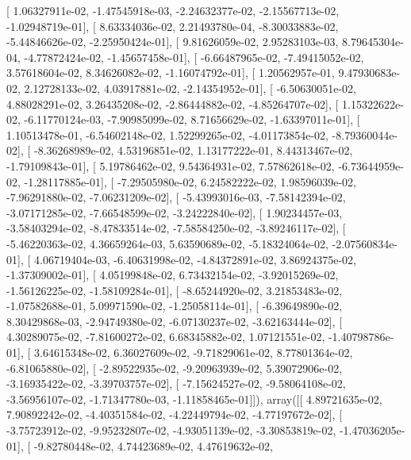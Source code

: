 \documentclass{article}
\begin{document}
       [  1.06327911e-02,  -1.47545918e-03,  -2.24632377e-02,
         -2.15567713e-02,  -1.02948719e-01],
       [  8.63334036e-02,   2.21493780e-04,  -8.30033883e-02,
         -5.44846626e-02,  -2.25950424e-01],
       [  9.81626059e-02,   2.95283103e-03,   8.79645304e-04,
         -4.77872424e-02,  -1.45657458e-01],
       [ -6.66487965e-02,  -7.49415052e-02,   3.57618604e-02,
          8.34626082e-02,  -1.16074792e-01],
       [  1.20562957e-01,   9.47930683e-02,   2.12728133e-02,
          4.03917881e-02,  -2.14354952e-01],
       [ -6.50630051e-02,   4.88028291e-02,   3.26435208e-02,
         -2.86444882e-02,  -4.85264707e-02],
       [  1.15322622e-02,  -6.11770124e-03,  -7.90985099e-02,
          8.71656629e-02,  -1.63397011e-01],
       [  1.10513478e-01,  -6.54602148e-02,   1.52299265e-02,
         -4.01173854e-02,  -8.79360044e-02],
       [ -8.36268989e-02,   4.53196851e-02,   1.13177222e-01,
          8.44313467e-02,  -1.79109843e-01],
       [  5.19786462e-02,   9.54364931e-02,   7.57862618e-02,
         -6.73644959e-02,  -1.28117885e-01],
       [ -7.29505980e-02,   6.24582222e-02,   1.98596039e-02,
         -7.96291880e-02,  -7.06231209e-02],
       [ -5.43993016e-03,  -7.58142394e-02,  -3.07171285e-02,
         -7.66548599e-02,  -3.24222840e-02],
       [  1.90234457e-03,  -3.58403294e-02,  -8.47833514e-02,
         -7.58584250e-02,  -3.89246117e-02],
       [ -5.46220363e-02,   4.36659264e-03,   5.63590689e-02,
         -5.18324064e-02,  -2.07560834e-01],
       [  4.06719404e-03,  -6.40631998e-02,  -4.84372891e-02,
          3.86924375e-02,  -1.37309002e-01],
       [  4.05199848e-02,   6.73432154e-02,  -3.92015269e-02,
         -1.56126225e-02,  -1.58109284e-01],
       [ -8.65244920e-02,   3.21853483e-02,  -1.07582688e-01,
          5.09971590e-02,  -1.25058114e-01],
       [ -6.39649890e-02,   8.30429868e-03,  -2.94749380e-02,
         -6.07130237e-02,  -3.62163444e-02],
       [  4.30289075e-02,  -7.81600272e-02,   6.68345882e-02,
          1.07121551e-02,  -1.40798786e-01],
       [  3.64615348e-02,   6.36027609e-02,  -9.71829061e-02,
          8.77801364e-02,  -6.81065880e-02],
       [ -2.89522935e-02,  -9.20963939e-02,   5.39072906e-02,
         -3.16935422e-02,  -3.39703757e-02],
       [ -7.15624527e-02,  -9.58064108e-02,  -3.56956107e-02,
         -1.71347780e-03,  -1.11858465e-01]]), array([[  4.89721635e-02,   7.90892242e-02,  -4.40351584e-02,
         -4.22449794e-02,  -4.77197672e-02],
       [ -3.75723912e-02,  -9.95232807e-02,  -4.93051139e-02,
         -3.30853819e-02,  -1.47036205e-01],
       [ -9.82780448e-02,   4.74423689e-02,   4.47619632e-02,
\end{document}
